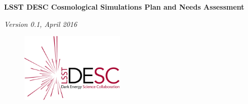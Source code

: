 \documentclass[12pt]{report}
\begin{document}
\pagestyle{empty}

\vspace*{0.3\textheight}

\begin{center}
{\Huge\bfseries LSST DESC Cosmological Simulations Plan and Needs Assessment}
\end{center}

\vspace*{0.1\textheight}

\begin{center}
{\it Version 0.1, April 2016}
\end{center}

\begin{figure}[!b]
\centering\includegraphics[width=5cm,angle=0]{desc-logo.png}
\end{figure}

\clearpage
\maketoc
\label{toc}
\clearpage

\pagestyle{fancy}
\fancyfoot{} %
\fancyfoot[R]{\thepage}  %
\fancyfoot[L]{\footernavigationbar}  %

\fancyhead[L]{}
\fancyhead[R]{\docheader}
\renewcommand{\footrulewidth}{1pt}













% 

% 


\nocite{*}


\end{document}
